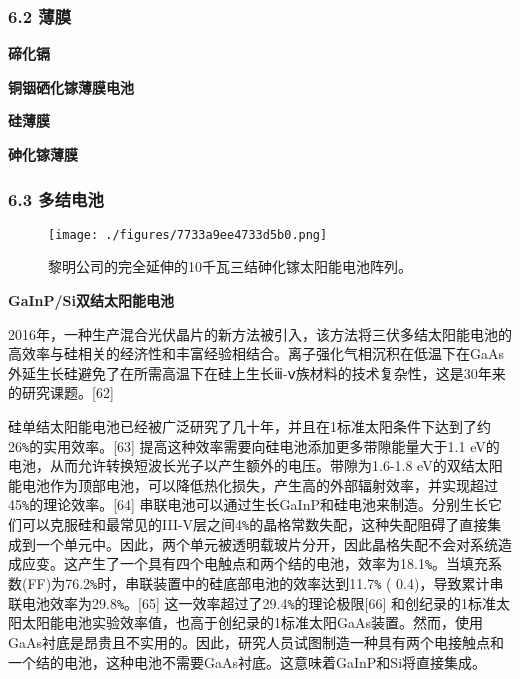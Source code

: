 \subsubsection{6.2 薄膜}



\textbf{碲化镉}



\textbf{铜铟硒化镓薄膜电池}



\textbf{硅薄膜}



\textbf{砷化镓薄膜}



\subsubsection{6.3 多结电池}

\begin{figure}[ht]
\centering
\texttt{[image: ./figures/7733a9ee4733d5b0.png]}
\caption{黎明公司的完全延伸的10千瓦三结砷化镓太阳能电池阵列。} \label{fig_TYNDC_6}
\end{figure}



\textbf{GaInP/Si双结太阳能电池}

2016年，一种生产混合光伏晶片的新方法被引入，该方法将三伏多结太阳能电池的高效率与硅相关的经济性和丰富经验相结合。离子强化气相沉积在低温下在GaAs外延生长硅避免了在所需高温下在硅上生长ⅲ-ⅴ族材料的技术复杂性，这是30年来的研究课题。[62]

硅单结太阳能电池已经被广泛研究了几十年，并且在1标准太阳条件下达到了约26\verb|%|的实用效率。[63] 提高这种效率需要向硅电池添加更多带隙能量大于1.1 eV的电池，从而允许转换短波长光子以产生额外的电压。带隙为1.6-1.8 eV的双结太阳能电池作为顶部电池，可以降低热化损失，产生高的外部辐射效率，并实现超过45\verb|%|的理论效率。[64] 串联电池可以通过生长GaInP和硅电池来制造。分别生长它们可以克服硅和最常见的III-V层之间4\verb|%|的晶格常数失配，这种失配阻碍了直接集成到一个单元中。因此，两个单元被透明载玻片分开，因此晶格失配不会对系统造成应变。这产生了一个具有四个电触点和两个结的电池，效率为18.1\verb|%|。当填充系数(FF)为76.2\verb|%|时，串联装置中的硅底部电池的效率达到11.7\verb|%| ( 0.4)，导致累计串联电池效率为29.8\verb|%|。[65] 这一效率超过了29.4\verb|%|的理论极限[66] 和创纪录的1标准太阳太阳能电池实验效率值，也高于创纪录的1标准太阳GaAs装置。然而，使用GaAs衬底是昂贵且不实用的。因此，研究人员试图制造一种具有两个电接触点和一个结的电池，这种电池不需要GaAs衬底。这意味着GaInP和Si将直接集成。

